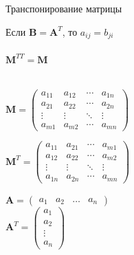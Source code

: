 \documentclass[10pt]{beamer}
\begin{document}
	\begin{frame}{Транспонирование матрицы}
		
		Если $\mathbf B=\mathbf A^T$, то $a_{ij}=b_{ji}$ \\ ~ \\
		
		$\mathbf M ^ {TT} = \mathbf M$ \\ ~ \\
		
		{
			$\mathbf M =
			\begin{pmatrix} a_{11} & a_{12} & \cdots & a_{1n}
				\\a_{21} & a_{22} & \cdots & a_{2n}
				\\ \vdots & \vdots & \ddots & \vdots
				\\ a_{m1} & a_{m2} & \cdots & a_{mn}
			\end{pmatrix} 
			$
			
			$\mathbf M^T =
			\begin{pmatrix} a_{11} & a_{21} & \cdots & a_{m1}
				\\a_{12} & a_{22} & \cdots & a_{m2}
				\\ \vdots & \vdots & \ddots & \vdots
				\\ a_{1n} & a_{2n} & \cdots & a_{mn}
			\end{pmatrix} 
			$ 
		}
		{
			$\mathbf A = \begin{pmatrix}
				a_1 & a_2 & \ldots & a_n
			\end{pmatrix}$ \\
			$\mathbf A^T = \begin{pmatrix}
				a_1 \\ a_2 \\ \vdots \\ a_n
			\end{pmatrix}$
		}
		
		
		
		
		
	\end{frame}
	
\end{document}
